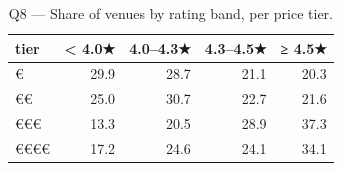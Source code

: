 \begin{table}[ht]
\centering
\caption{Q8 — Share of venues by rating band, per price tier.}
\label{tab:q8_price_rating_bands}
{\tiny
\begin{tabular}{lrrrr}
\toprule
tier & < 4.0★ & 4.0–4.3★ & 4.3–4.5★ & ≥ 4.5★ \\
\midrule
€ & 29.9 & 28.7 & 21.1 & 20.3 \\
€€ & 25.0 & 30.7 & 22.7 & 21.6 \\
€€€ & 13.3 & 20.5 & 28.9 & 37.3 \\
€€€€ & 17.2 & 24.6 & 24.1 & 34.1 \\
\bottomrule
\end{tabular}
}
\end{table}
